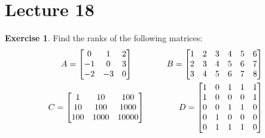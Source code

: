 \documentclass[a4paper]{amsart}
\theoremstyle{definition}
\newtheorem{exercise}{Exercise}
\begin{document}
\section{Lecture 18}

\begin{exercise}\label{ex-rank-i}
 Find the ranks of the following matrices:
 \begin{align*}
  A = \left[\begin{matrix}
   0& 1& 2\\
  -1& 0& 3\\
  -2&-3& 0\\
  \end{matrix}\right] \qquad\qquad
  B = \left[\begin{matrix}
   1&2&3&4&5&6\\
   2&3&4&5&6&7\\
   3&4&5&6&7&8\\
  \end{matrix}\right] \\
  C = \left[\begin{matrix}
   1&10&100\\
   10&100&1000\\
   100&1000&10000\\
  \end{matrix}\right] \qquad\qquad
  D = \left[\begin{matrix}
   1&0&1&1&1\\
   1&0&0&0&1\\
   0&0&1&1&0\\
   0&1&0&0&0\\
   0&1&1&1&0\\
  \end{matrix}\right]
 \end{align*}
\end{exercise}
\end{document}
